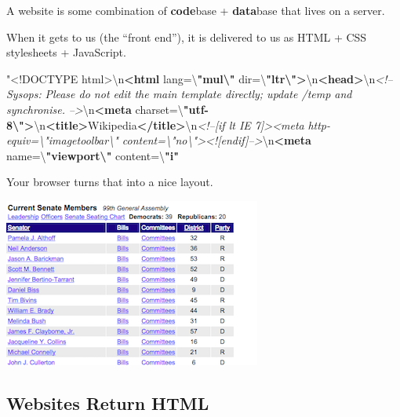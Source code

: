 \documentclass[
]{book}
\newenvironment{Shaded}{\begin{snugshade}}{\end{snugshade}}
\newcommand{\CommentTok}[1]{\textcolor[rgb]{0.56,0.35,0.01}{\textit{#1}}}
\newcommand{\DataTypeTok}[1]{\textcolor[rgb]{0.13,0.29,0.53}{#1}}
\newcommand{\ErrorTok}[1]{\textcolor[rgb]{0.64,0.00,0.00}{\textbf{#1}}}
\newcommand{\KeywordTok}[1]{\textcolor[rgb]{0.13,0.29,0.53}{\textbf{#1}}}
\newcommand{\NormalTok}[1]{#1}
\newcommand{\OtherTok}[1]{\textcolor[rgb]{0.56,0.35,0.01}{#1}}
\newcommand{\StringTok}[1]{\textcolor[rgb]{0.31,0.60,0.02}{#1}}
\begin{document}
A website is some combination of \textbf{code}base + \textbf{data}base that lives on a server.

When it gets to us (the ``front end''), it is delivered to us as HTML + CSS stylesheets + JavaScript.

\begin{Shaded}
\begin{Highlighting}[]
\NormalTok{"}\DataTypeTok{<!DOCTYPE }\NormalTok{html}\DataTypeTok{>}\NormalTok{\textbackslash{}n}\KeywordTok{<html}\OtherTok{ lang=}\StringTok{\textbackslash{}}\ErrorTok{"mul\textbackslash{}"}\OtherTok{ dir=}\StringTok{\textbackslash{}}\ErrorTok{"ltr\textbackslash{}"}\KeywordTok{>}\NormalTok{\textbackslash{}n}\KeywordTok{<head>}\NormalTok{\textbackslash{}n}\CommentTok{<!-- Sysops: }
\CommentTok{Please do not edit the main template directly; update /temp and synchronise. }
\CommentTok{-->}\NormalTok{\textbackslash{}n}\KeywordTok{<meta}\OtherTok{ charset=}\StringTok{\textbackslash{}}\ErrorTok{"utf-8\textbackslash{}"}\KeywordTok{>}\NormalTok{\textbackslash{}n}\KeywordTok{<title>}\NormalTok{Wikipedia}\KeywordTok{</title>}\NormalTok{\textbackslash{}n}\CommentTok{<!--[if lt IE 7]><meta}
\CommentTok{http-equiv=\textbackslash{}"imagetoolbar\textbackslash{}" content=\textbackslash{}"no\textbackslash{}"><![endif]-->}\NormalTok{\textbackslash{}n}\KeywordTok{<meta}\OtherTok{ name=}\StringTok{\textbackslash{}}\ErrorTok{"viewport\textbackslash{}"}
\OtherTok{content=}\StringTok{\textbackslash{}}\ErrorTok{"i"}
\end{Highlighting}
\end{Shaded}

Your browser turns that into a nice layout.

\begin{center}\includegraphics[width=0.7\linewidth]{img/layout} \end{center}

\hypertarget{websites-return-html}{%
\subsection{Websites Return HTML}\label{websites-return-html}}
\end{document}
